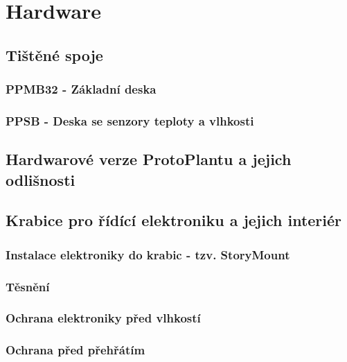 \chapter{Hardware}

\section{Tištěné spoje}

\subsection{PPMB32 - Základní deska}

\subsection{PPSB - Deska se senzory teploty a vlhkosti}

\section{Hardwarové verze ProtoPlantu a jejich odlišnosti}

\section{Krabice pro řídící elektroniku a jejich interiér}

\subsection{Instalace elektroniky do krabic - tzv. StoryMount}

\subsection{Těsnění}

\subsection{Ochrana elektroniky před vlhkostí}

\subsection{Ochrana před přehřátím}

\newpage